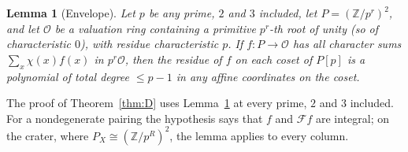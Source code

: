 \documentclass[11pt]{amsart}
\numberwithin{equation}{section}
\theoremstyle{plain}
\newtheorem{lemma}[theorem]{Lemma}
\theoremstyle{definition}
\theoremstyle{remark}
\begin{document}
\begin{lemma}[Envelope]\label{lem:envelope}
Let \(p\) be any prime, \(2\) and \(3\) included, let \(P=(\mathbb Z/p^r)^2\), and let \(\mathcal O\) be a valuation ring containing a primitive \(p^r\)-th root of unity (so of characteristic \(0\)), with residue characteristic \(p\). If \(f:P\to\mathcal O\) has all character sums \(\sum_x\chi(x)f(x)\) in \(p^r\mathcal O\), then the residue of \(f\) on each coset of \(P[p]\) is a polynomial of total degree \(\le p-1\) in any affine coordinates on the coset.
\end{lemma}

The proof of Theorem~\ref{thm:D} uses Lemma~\ref{lem:envelope} at every prime, \(2\) and \(3\) included. For a nondegenerate pairing the hypothesis says that \(f\) and \(\mathcal Ff\) are integral; on the crater, where \(P_X\cong(\mathbb Z/p^R)^2\), the lemma applies to every column.
\end{document}
